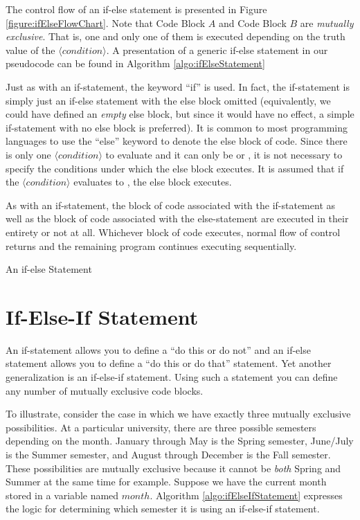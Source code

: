 The control flow of an if-else statement is presented in Figure 
\ref{figure:ifElseFlowChart}.  Note that Code Block $A$ and Code Block $B$ 
are \emph{mutually exclusive}.  That is, one and only one of them 
is executed depending on the truth value of the $\langle condition \rangle$.
A presentation of a generic if-else statement in our pseudocode can
be found in Algorithm \ref{algo:ifElseStatement}

Just as with an if-statement, the keyword ``if'' is used.  In fact, the if-statement
is simply just an if-else statement with the else block omitted (equivalently, we
could have defined an \emph{empty} else block, but since it would have no
effect, a simple if-statement with no else block is preferred).  It is common to
most programming languages to use the ``else'' keyword to denote the else
block of code.  Since there is only one $\langle condition \rangle$ to evaluate
and it can only be \True or \False, it is not necessary to specify the conditions
under which the else block executes.  It is assumed that if the $\langle condition \rangle$
evaluates to \False, the else block executes.  

As with an if-statement, the block of code associated with the if-statement as
well as the block of code associated with the else-statement are executed
in their entirety or not at all.  Whichever block of code executes, normal flow
of control returns and the remaining program continues executing sequentially.

\begin{algorithm}[h]
\caption{An if-else Statement}
\label{algo:ifElseStatement}
\end{algorithm}

\section{If-Else-If Statement}

An if-statement allows you to define a ``do this or do not'' and an if-else statement
allows you to define a ``do this or do that'' statement.  Yet another generalization is
an if-else-if statement.  Using such a statement you can define any number of
mutually exclusive code blocks.  

To illustrate, consider the case in which we have exactly three mutually exclusive
possibilities.  At a particular university, there are three possible semesters depending
on the month.  January through May is the Spring semester, June/July is the Summer
semester, and August through December is the Fall semester.  These possibilities
are mutually exclusive because it cannot be \emph{both} Spring and Summer at the
same time for example.  Suppose we have the current month stored in a variable
named $month$.  Algorithm \ref{algo:ifElseIfStatement} expresses the logic
for determining which semester it is using an if-else-if statement.

